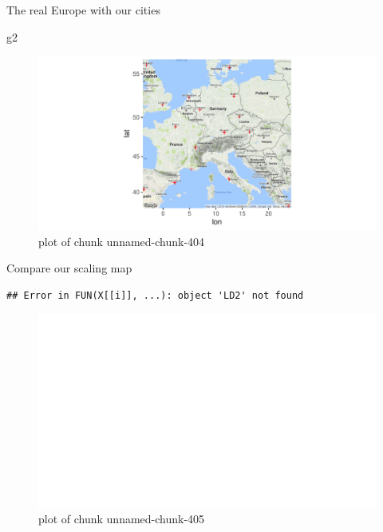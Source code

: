 \documentclass[ignorenonframetext,]{beamer}
\newenvironment{Shaded}{\begin{snugshade}}{\end{snugshade}}
\newcommand{\NormalTok}[1]{#1}
\begin{document}
\begin{frame}[fragile]{The real Europe with our cities}
\protect\hypertarget{the-real-europe-with-our-cities}{}

\begin{Shaded}
\begin{Highlighting}[]
\NormalTok{g2}
\end{Highlighting}
\end{Shaded}

\begin{figure}
\centering
\includegraphics{figure/unnamed-chunk-404-1.pdf}
\caption{plot of chunk unnamed-chunk-404}
\end{figure}

\end{frame}

\begin{frame}[fragile]{Compare our scaling map}
\protect\hypertarget{compare-our-scaling-map}{}

\begin{verbatim}
## Error in FUN(X[[i]], ...): object 'LD2' not found
\end{verbatim}

\begin{figure}
\centering
\includegraphics{figure/unnamed-chunk-405-1.pdf}
\caption{plot of chunk unnamed-chunk-405}
\end{figure}

\end{frame}
\end{document}

